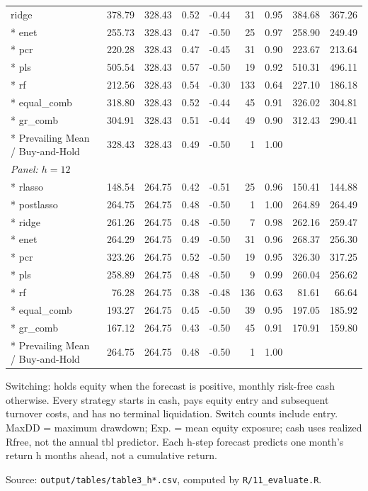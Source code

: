 \begin{longtable}{lrrrrrrrr}
ridge & 378.79 & 328.43 & 0.52 & -0.44 &  31 & 0.95 & 384.68 & 367.26 \\*
enet & 255.73 & 328.43 & 0.47 & -0.50 &  25 & 0.97 & 258.90 & 249.49 \\*
pcr & 220.28 & 328.43 & 0.47 & -0.45 &  31 & 0.90 & 223.67 & 213.64 \\*
pls & 505.54 & 328.43 & 0.57 & -0.50 &  19 & 0.92 & 510.31 & 496.11 \\*
rf & 212.56 & 328.43 & 0.54 & -0.30 & 133 & 0.64 & 227.10 & 186.18 \\*
equal\_comb & 318.80 & 328.43 & 0.52 & -0.44 &  45 & 0.91 & 326.02 & 304.81 \\*
gr\_comb & 304.91 & 328.43 & 0.51 & -0.44 &  49 & 0.90 & 312.43 & 290.41 \\*
Prevailing Mean / Buy-and-Hold & 328.43 & 328.43 & 0.49 & -0.50 &   1 & 1.00 &  &  \\
\multicolumn{9}{l}{\emph{Panel: $h=12$}} \\*
rlasso & 148.54 & 264.75 & 0.42 & -0.51 &  25 & 0.96 & 150.41 & 144.88 \\*
postlasso & 264.75 & 264.75 & 0.48 & -0.50 &   1 & 1.00 & 264.89 & 264.49 \\*
ridge & 261.26 & 264.75 & 0.48 & -0.50 &   7 & 0.98 & 262.16 & 259.47 \\*
enet & 264.29 & 264.75 & 0.49 & -0.50 &  31 & 0.96 & 268.37 & 256.30 \\*
pcr & 323.26 & 264.75 & 0.52 & -0.50 &  19 & 0.95 & 326.30 & 317.25 \\*
pls & 258.89 & 264.75 & 0.48 & -0.50 &   9 & 0.99 & 260.04 & 256.62 \\*
rf & 76.28 & 264.75 & 0.38 & -0.48 & 136 & 0.63 & 81.61 & 66.64 \\*
equal\_comb & 193.27 & 264.75 & 0.45 & -0.50 &  39 & 0.95 & 197.05 & 185.92 \\*
gr\_comb & 167.12 & 264.75 & 0.43 & -0.50 &  45 & 0.91 & 170.91 & 159.80 \\*
Prevailing Mean / Buy-and-Hold & 264.75 & 264.75 & 0.48 & -0.50 &   1 & 1.00 &  &  \\
\end{longtable}
\endgroup
\begin{list}{}{\setlength{\leftmargin}{0pt}\setlength{\itemsep}{0pt}\setlength{\topsep}{0pt}}
\item Switching: holds equity when the forecast is positive, monthly risk-free cash otherwise. Every strategy starts in cash, pays equity entry and subsequent turnover costs, and has no terminal liquidation. Switch counts include entry. MaxDD = maximum drawdown; Exp. = mean equity exposure; cash uses realized Rfree, not the annual tbl predictor. Each h-step forecast predicts one month's return h months ahead, not a cumulative return.
\item Source: \texttt{output/tables/table3\_h*.csv}, computed by \texttt{R/11\_evaluate.R}.
\end{list}
